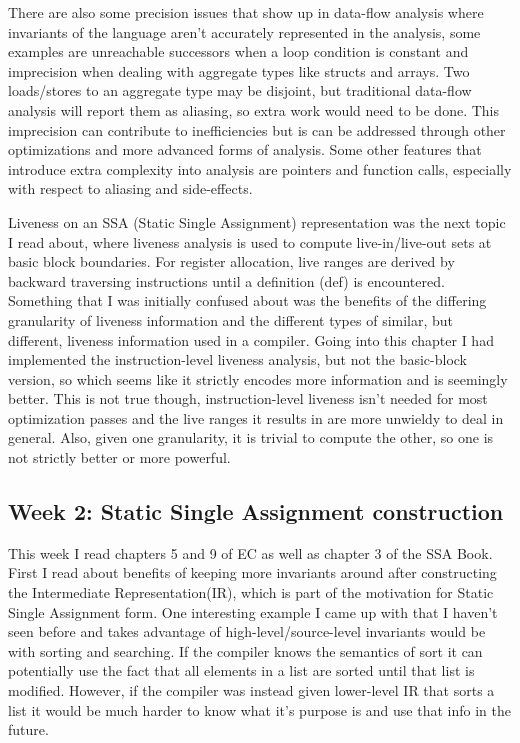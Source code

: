 \documentclass[11pt, a4paper, titlepage]{article}
\begin{document}
There are also some precision issues that show up in data-flow analysis where invariants of the language aren't accurately represented in the analysis, some examples are unreachable successors when a loop condition is constant and imprecision when dealing with aggregate types like structs and arrays. Two loads/stores to an aggregate type may be disjoint, but traditional data-flow analysis will report them as aliasing, so extra work would need to be done. This imprecision can contribute to inefficiencies but is can be addressed through other optimizations and more advanced forms of analysis. Some other features that introduce extra complexity into analysis are pointers and function calls, especially with respect to aliasing and side-effects.

Liveness on an SSA (Static Single Assignment) representation was the next topic I read about, where liveness analysis is used to compute live-in/live-out sets at basic block boundaries. For register allocation, live ranges are derived by backward traversing instructions until a definition (def) is encountered. Something that I was initially confused about was the benefits of the differing granularity of liveness information and the different types of similar, but different, liveness information used in a compiler. Going into this chapter I had implemented the instruction-level liveness analysis, but not the basic-block version, so which seems like it strictly encodes more information and is seemingly better. This is not true though, instruction-level liveness isn't needed for most optimization passes and the live ranges it results in are more unwieldy to deal in general. Also, given one granularity, it is trivial to compute the other, so one is not strictly better or more powerful.

\subsection{Week 2: Static Single Assignment construction} 

This week I read chapters 5 and 9 of EC as well as chapter 3 of the SSA Book. First I read about benefits of keeping more invariants around after constructing the Intermediate Representation(IR), which is part of the motivation for Static Single Assignment form. One interesting example I came up with that I haven't seen before and takes advantage of high-level/source-level invariants would be with sorting and searching. If the compiler knows the semantics of sort it can potentially use the fact that all elements in a list are sorted until that list is modified. However, if the compiler was instead given lower-level IR that sorts a list it would be much harder to know what it's purpose is and use that info in the future.
\end{document}
